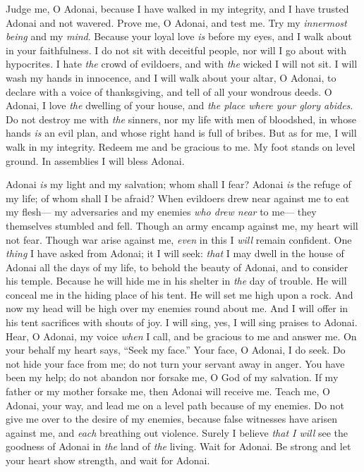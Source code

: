 \begin{biblechapter} %
 Judge me, O Adonai, because I have walked in my integrity, 
and I have trusted Adonai and not wavered.
\verse Prove me, O Adonai, and test me. 
Try my \textit{innermost being} and my \textit{mind}.
\verse Because your loyal love \textit{is} before my eyes, 
and I walk about in your faithfulness.
\verse I do not sit with deceitful people, 
nor will I go about with hypocrites.
\verse I hate \textit{the} crowd of evildoers, 
and with \textit{the} wicked I will not sit.
\verse I will wash my hands in innocence, 
and I will walk about your altar, O Adonai,
\verse to declare with a voice of thanksgiving, 
and tell of all your wondrous deeds.
\verse O Adonai, I love \textit{the} dwelling of your house, 
and \textit{the place where your glory abides}.
\verse Do not destroy me with \textit{the} sinners, 
nor my life with men of bloodshed,
\verse in whose hands \textit{is} an evil plan, 
and whose right hand is full of bribes.
\verse But as for me, I will walk in my integrity. 
Redeem me and be gracious to me.
\verse My foot stands on level ground. 
In assemblies I will bless Adonai.
\end{biblechapter}

\begin{biblechapter} %
 Adonai \textit{is} my light and my salvation; 
whom shall I fear? 
Adonai \textit{is} the refuge of my life; 
of whom shall I be afraid?
\verse When evildoers drew near against me to eat my flesh— 
my adversaries and my enemies \textit{who drew near} to me— 
they themselves stumbled and fell.
\verse Though an army encamp against me, 
my heart will not fear. 
Though war arise against me, 
\textit{even} in this I \textit{will} remain confident.
\verse One \textit{thing} I have asked from Adonai; 
it I will seek: 
\textit{that} I may dwell in the house of Adonai all the days of my life, 
to behold the beauty of Adonai, 
and to consider his temple.
\verse Because he will hide me in his shelter in \textit{the} day of trouble. 
He will conceal me in the hiding place of his tent. 
He will set me high upon a rock.
\verse And now my head will be high over my enemies round about me. 
And I will offer in his tent sacrifices with shouts of joy. 
I will sing, yes, I will sing praises to Adonai.
\verse Hear, O Adonai, my voice \textit{when} I call, 
and be gracious to me and answer me.
\verse On your behalf my heart says, “Seek my face.” 
Your face, O Adonai, I do seek.
\verse Do not hide your face from me; 
do not turn your servant away in anger. 
You have been my help; do not abandon nor forsake me, 
O God of my salvation.
\verse If my father or my mother forsake me, 
then Adonai will receive me.
\verse Teach me, O Adonai, your way, 
and lead me on a level path because of my enemies.
\verse Do not give me over to the desire of my enemies, 
because false witnesses have arisen against me, 
and \textit{each} breathing out violence.
\verse Surely I believe \textit{that I will} see the goodness of Adonai 
in \textit{the} land of \textit{the} living.
\verse Wait for Adonai. 
Be strong and let your heart show strength, 
and wait for Adonai.
\end{biblechapter}

